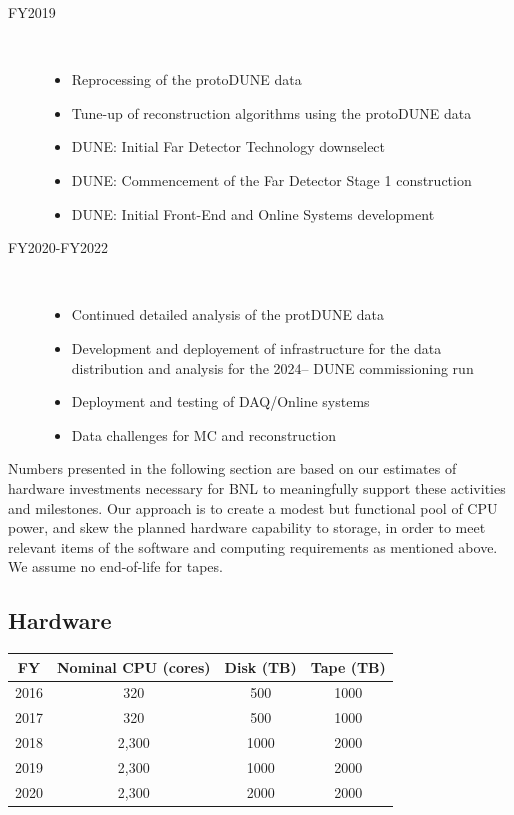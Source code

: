 \documentclass[pdftex,12pt,letter]{article}
\begin{document}
\begin{description}
\item[FY2019] \
\begin{itemize}
\item Reprocessing of the protoDUNE data
\item Tune-up of reconstruction algorithms using the protoDUNE data
\item DUNE: Initial Far Detector Technology downselect
\item DUNE: Commencement of the Far Detector Stage 1 construction
\item DUNE: Initial Front-End and Online Systems development
\end{itemize}

\item[FY2020-FY2022] \
\begin{itemize}
\item Continued detailed analysis of the protDUNE data
\item Development and deployement of infrastructure for the data distribution and analysis for the 2024-- DUNE commissioning run
\item Deployment and testing of DAQ/Online systems
\item Data challenges for MC and reconstruction
\end{itemize}
\end{description}

\noindent Numbers presented in the following section are based on our
estimates of hardware investments necessary for BNL to meaningfully
support these activities and milestones. 
Our approach is to create a modest but functional pool of CPU power,
and skew the planned hardware capability to storage, in order to meet
relevant items of the software and computing requirements as mentioned
above.  We assume no end-of-life for tapes.

\subsection{Hardware}
\begin{table}[tbh]
\centering
\begin{tabular}{|c|c|c|c|}
\hline
FY & Nominal CPU (cores) & Disk (TB) & Tape (TB) \\
\hline
2016  &  320 &  500 & 1000   \\
\hline
2017 &  320 & 500  & 1000  \\
\hline
2018 &  2,300 & 1000  & 2000 \\
\hline
2019  &  2,300 & 1000 & 2000  \\
\hline
2020 &  2,300  & 2000 & 2000 \\
\hline
\end{tabular}
\end{table}
\end{document}
